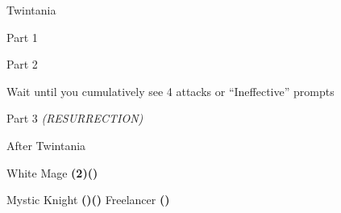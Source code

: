 \begin{paracol}{2}
\begin{boss}{Twintania}
    \varwb
    \begin{bossPart}{Part 1}
        \bartz \leftCommand{\hide}
    \end{bossPart}
    \begin{bossPart}{Part 2}
        \item Wait until you cumulatively see 4 attacks or “Ineffective” prompts
        \bartz \leftCommand{\showAbility}
    \end{bossPart}
    \begin{bossPart}{Part 3}
        \bartz \rightCommand{\combine} \then \battleGroup{\hiPotion \space + \phoenixDown} \textit{(RESURRECTION)} \then {} 
        \item {}
        \item {}
        \lenna \leftCommand{\blue} \then \lfiveDeath
    \end{bossPart}
    \varwe
\end{boss}

\begin{menu}{After Twintania}
    \varwb
    \begin{jobMenu}
        \lenna White Mage \textbf{(2\pointRight)(\pointDown)}
    \end{jobMenu}
    \begin{itemMenu}
        \elixirMenu {}
    \end{itemMenu}
    \begin{magicMenu}
        \lenna \life \space \then {}
    \end{magicMenu}
    \begin{jobMenu}
        \lenna Mystic Knight \textbf{(\pointRight)(\pointDown)} \optimize
        \faris Freelancer \textbf{(\pointLeft)} 
    \end{jobMenu}
    \begin{abilityMenu}
        \bartz {} \optimize
    \end{abilityMenu}
    \varwe
\end{menu}

\end{paracol}